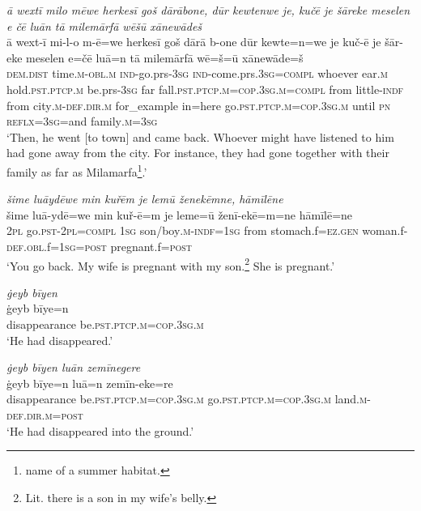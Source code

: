 \ea \label{BP.167}
\textit{ā wextī milo mēwe herkesī goš dārābone, dūr kewtenwe je, kučē je šāreke meselen e čē luān tā milemārfā wēšū xānewādeš} \\ 
\gll ā wext-ī mi-l-o m-ē=we herkesī goš dārā b-one dūr kewte=n=we je kuč-ē je šār-eke meselen e=čē luā=n tā milemārfā wē=š=ū xānewāde=š \\ 
 \textsc{dem.dist} time\textsc{.m}\textsc{-obl}\textsc{.m} \textsc{ind-}go.prs\textsc{-3sg} \textsc{ind-}come.prs\textsc{.3sg}\textsc{=compl} whoever ear\textsc{.m} hold\textsc{.pst}\textsc{.ptcp}\textsc{.m} be.prs\textsc{-3sg} far fall\textsc{.pst}\textsc{.ptcp}\textsc{.m}\textsc{=cop}\textsc{.3sg}\textsc{.m}\textsc{=compl} from little\textsc{-indf} from city\textsc{.m}\textsc{-def}\textsc{.dir}\textsc{.m} for\_example in=here go\textsc{.pst}\textsc{.ptcp}\textsc{.m}\textsc{=cop}\textsc{.3sg}\textsc{.m} until \textsc{pn} \textsc{reflx}\textsc{=3sg}=and family\textsc{.m}\textsc{=3sg} \\ 
\glt `Then, he went [to town] and came back. Whoever might have listened to him had gone away from the city. For instance, they had gone together with their family as far as Milamarfa\footnote{name of a summer habitat.}.'
\z 
 
\ea \label{BP.185}
\textit{šime luāydēwe min kuřēm je lemū ženekēmne, hāmīlēne} \\ 
\gll šime luā-ydē=we min kuř-ē=m je leme=ū ženī-ekē=m=ne hāmīlē=ne \\ 
 \textsc{2pl} go\textsc{.pst}-\textsc{2pl}\textsc{=compl} \textsc{1sg} son/boy\textsc{.m}\textsc{-indf}\textsc{=\textsc{1sg}} from stomach.f\textsc{=ez.gen} woman.f\textsc{-def}\textsc{.obl}.f\textsc{=\textsc{1sg}}\textsc{=\textsc{post}} pregnant.f\textsc{=\textsc{post}} \\ 
\glt `You go back. My wife is pregnant with my son.\footnote{Lit. there is a son in my wife’s belly.} She is pregnant.'
\z 
 
\ea \label{BP.195}
\textit{ġeyb bīyen} \\ 
\gll ġeyb bīye=n \\ 
 disappearance be\textsc{.pst}\textsc{.ptcp}\textsc{.m}\textsc{=cop}\textsc{.3sg}\textsc{.m} \\ 
\glt `He had disappeared.'
\z 
 
\ea \label{BP.196}
\textit{ġeyb bīyen luān zemīnegere} \\ 
\gll ġeyb bīye=n luā=n zemīn-eke=re \\ 
 disappearance be\textsc{.pst}\textsc{.ptcp}\textsc{.m}\textsc{=cop}\textsc{.3sg}\textsc{.m} go\textsc{.pst}\textsc{.ptcp}\textsc{.m}\textsc{=cop}\textsc{.3sg}\textsc{.m} land\textsc{.m}\textsc{-def}\textsc{.dir}\textsc{.m}\textsc{=\textsc{post}} \\ 
\glt `He had disappeared into the ground.'
\z 
 
